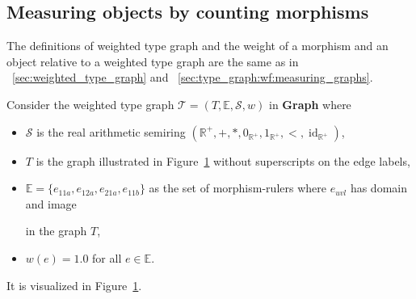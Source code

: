 \subsection{Measuring objects by counting morphisms}
The definitions of weighted type graph and the weight of a morphism and an object relative to a weighted type graph are the same as in \textsection~\ref{sec:weighted_type_graph} and \textsection~\ref{sec:type_graph:wf:measuring_graphs}.
\begin{example}
    \label{nwf:example:weighted_type_graph}
     Consider the weighted type graph $\mathcal{T} = (T, \mathbb{E}, \mathcal{S}, w)$ in \textbf{Graph} where
     \begin{itemize}
        \item $\mathcal{S}$ is the real arithmetic semiring $(\mathbb{R}^+, +, *, 0_{\mathbb{R}^+}, 1_{\mathbb{R}^+}, <, \operatorname{id}_{\mathbb{R}^+})$,
        \item $T$ is the graph illustrated in Figure~\ref{fig:nwf:weighted_type_graph_sss} without superscripts on the edge labels,
        \item $\mathbb{E}=\{e_{11a},e_{12a},e_{21a},e_{11b}\}$ as the set of morphism-rulers where 
     $e_{uvl}$ has domain 
      and image 
     in the graph $T$,
    \item $w(e) = 1.0$ for all $e \in \mathbb{E}$.
     \end{itemize} 
\noindent It is visualized in Figure~\ref{fig:nwf:weighted_type_graph_sss}.
    \begin{figure}[H] 
        \centering
        \caption{}
        \label{fig:nwf:weighted_type_graph_sss}
    \end{figure}


\end{example}
